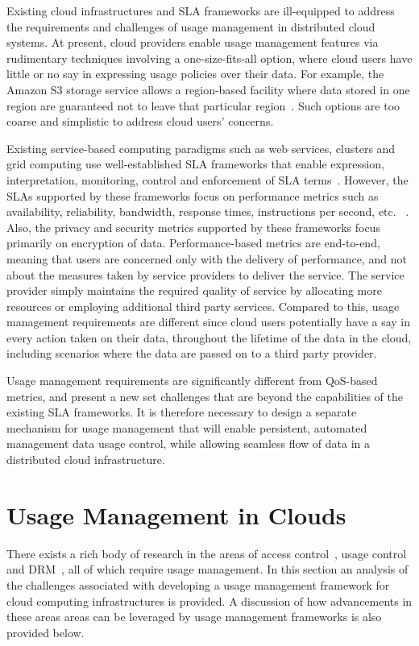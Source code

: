 \documentclass[10pt,letterpaper]{book}
\begin{document}
Existing cloud infrastructures and SLA frameworks are ill-equipped to address the requirements and challenges of usage management in distributed cloud systems. At present, cloud providers enable usage management features via rudimentary techniques involving a  one-size-fits-all option, where cloud users have little or no say in expressing usage policies over their data. For example, the Amazon S3 storage service allows a region-based facility where data stored in one region are guaranteed not to leave that particular region~\cite{AWS}. Such options are too coarse and simplistic to address cloud users' concerns. 

Existing service-based computing paradigms such as web services, clusters and grid computing use well-established SLA frameworks that enable expression, interpretation, monitoring, control and enforcement of SLA terms~\cite{WSA, WSLA, WSP,PaRaSh:09}. However, the SLAs supported by these frameworks focus on performance metrics such as availability, reliability, bandwidth, response times, instructions per second, etc. ~\cite{PaSc:06}. Also, the privacy and security metrics supported by these frameworks focus primarily on encryption of data. Performance-based metrics are end-to-end, meaning that users are concerned only with the delivery of performance, and not about the measures taken by service providers to deliver the service. The service provider simply maintains the required quality of service by allocating more resources or employing additional third party services. Compared to this, usage management requirements are different since cloud users potentially have a say in every action taken on their data, throughout the lifetime of the data in the cloud, including scenarios where the data are passed on to a third party provider. 

Usage management requirements are significantly different from QoS-based metrics, and present a new set challenges that are beyond the capabilities of the existing SLA frameworks. It is therefore necessary to design a separate mechanism for usage management that will enable persistent, automated management data usage control, while allowing seamless flow of data in a distributed cloud infrastructure. 

\section{Usage Management in Clouds}\label{sec:clouds-usage}
There exists a rich body of research in the areas of access control~\cite{BlPa:73,BlPa:76}, usage control~\cite{PaSa:04,JaHeLa:10} and DRM~\cite{ArHu:07,HaWe:08, ODRL-req,JaHe:08,XrML-spec}, all of which require usage management.  In this section an analysis of the challenges associated with developing a usage management framework for cloud computing infrastructures is provided. A discussion of how advancements in these areas areas can be leveraged by usage management frameworks is also provided below.
\end{document}
